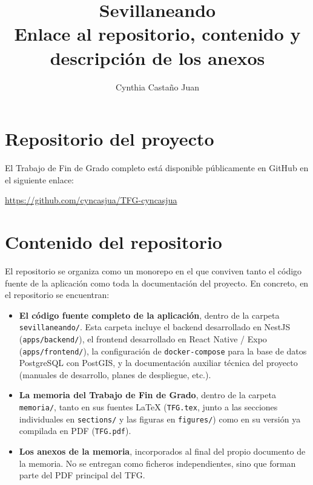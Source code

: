 \documentclass[11pt,a4paper]{article}
\title{\textbf{Sevillaneando} \\ \large Enlace al repositorio, contenido y descripci\'on de los anexos}
\author{Cynthia Casta\~no Juan}
\date{}
\begin{document}
\maketitle

\section*{Repositorio del proyecto}

El Trabajo de Fin de Grado completo est\'a disponible p\'ublicamente en GitHub en el siguiente enlace:

\begin{center}
\large\url{https://github.com/cyncasjua/TFG-cyncasjua}
\end{center}

\section*{Contenido del repositorio}

El repositorio se organiza como un monorepo en el que conviven tanto el c\'odigo fuente de la aplicaci\'on como toda la documentaci\'on del proyecto. En concreto, en el repositorio se encuentran:

\begin{itemize}[leftmargin=1.5em]
    \item \textbf{El c\'odigo fuente completo de la aplicaci\'on}, dentro de la carpeta \texttt{sevillaneando/}. Esta carpeta incluye el backend desarrollado en NestJS (\texttt{apps/backend/}), el frontend desarrollado en React Native / Expo (\texttt{apps/frontend/}), la configuraci\'on de \texttt{docker-compose} para la base de datos PostgreSQL con PostGIS, y la documentaci\'on auxiliar t\'ecnica del proyecto (manuales de desarrollo, planes de despliegue, etc.).

    \item \textbf{La memoria del Trabajo de Fin de Grado}, dentro de la carpeta \texttt{memoria/}, tanto en sus fuentes \LaTeX{} (\texttt{TFG.tex}, junto a las secciones individuales en \texttt{sections/} y las figuras en \texttt{figures/}) como en su versi\'on ya compilada en PDF (\texttt{TFG.pdf}).

    \item \textbf{Los anexos de la memoria}, incorporados al final del propio documento de la memoria. No se entregan como ficheros independientes, sino que forman parte del PDF principal del TFG.
\end{itemize}
\end{document}
